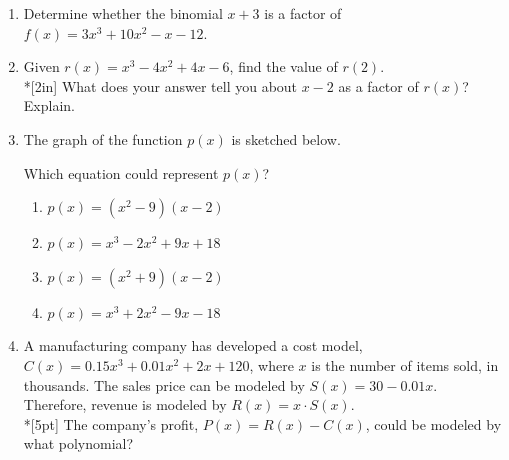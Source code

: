 \documentclass[12pt, oneside]{article}
\begin{document}

\vspace{1cm}

\begin{enumerate}

\item Determine whether the binomial $x+3$ is a factor of $f(x)=3x^3+10x^2-x-12$.\\[5in]

\item Given $r(x)=x^3-4x^2+4x-6$, find the value of $r(2)$.\\*[2in]
What does your answer tell you about $x-2$ as a factor of $r(x)$? Explain. %

\newpage
\item The graph of the function $p(x)$ is sketched below.
\begin{center}
\end{center}
Which equation could represent $p(x)$?
\begin{enumerate}
    \item $p(x)=(x^2- 9)(x-2)$
    \item $p(x)=x^3 -2x^2+ 9x+18$
    \item $p(x)=(x^2+ 9)(x-2)$
    \item $p(x)=x^3 +2x^2- 9x-18$
\end{enumerate} %

\item A manufacturing company has developed a cost model, $C(x)=0.15x^3+0.01x^2+2x+120$, where $x$ is the number of items sold, in thousands. The sales price can be modeled by $S(x)=30-0.01x$. Therefore, revenue is modeled by $R(x)=x \cdot S(x)$.\\*[5pt]
The company’s profit, $P(x)=R(x)-C(x)$, could be modeled by what polynomial?  %


\end{enumerate}
\end{document}

